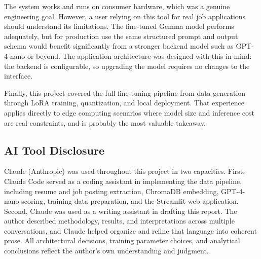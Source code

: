 \documentclass[10pt,twocolumn,letterpaper]{article}
\begin{document}
The system works and runs on consumer hardware, which was a genuine engineering goal. However, a user relying on this tool for real job applications should understand its limitations. The fine-tuned Gemma model performs adequately, but for production use the same structured prompt and output schema would benefit significantly from a stronger backend model such as GPT-4-nano or beyond. The application architecture was designed with this in mind: the backend is configurable, so upgrading the model requires no changes to the interface.

Finally, this project covered the full fine-tuning pipeline from data generation through LoRA training, quantization, and local deployment. That experience applies directly to edge computing scenarios where model size and inference cost are real constraints, and is probably the most valuable takeaway.

\subsection*{AI Tool Disclosure}

Claude (Anthropic) was used throughout this project in two capacities. First, Claude Code served as a coding assistant in implementing the data pipeline, including resume and job posting extraction, ChromaDB embedding, GPT-4-nano scoring, training data preparation, and the Streamlit web application. Second, Claude was used as a writing assistant in drafting this report. The author described methodology, results, and interpretations across multiple conversations, and Claude helped organize and refine that language into coherent prose. All architectural decisions, training parameter choices, and analytical conclusions reflect the author's own understanding and judgment.

{\small


}
\end{document}
